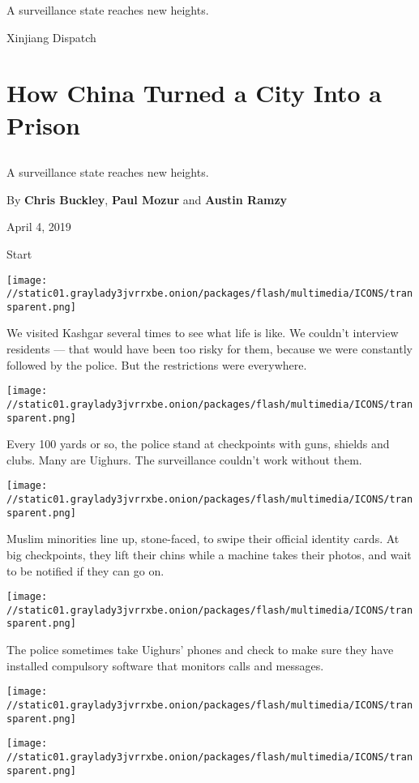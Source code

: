 A surveillance state reaches new heights.

Xinjiang Dispatch

\hypertarget{how-china-turned-a-city-into-a-prison-1}{%
\section{How China Turned a City Into a
Prison}\label{how-china-turned-a-city-into-a-prison-1}}

\subsection{}

A surveillance state reaches new heights.

By \textbf{Chris Buckley}, \textbf{Paul Mozur} and \textbf{Austin Ramzy}

April 4, 2019

Start

\texttt{[image: //static01.graylady3jvrrxbe.onion/packages/flash/multimedia/ICONS/transparent.png]}

We visited Kashgar several times to see what life is like. We couldn't
interview residents --- that would have been too risky for them, because
we were constantly followed by the police. But the restrictions were
everywhere.

\texttt{[image: //static01.graylady3jvrrxbe.onion/packages/flash/multimedia/ICONS/transparent.png]}

Every 100 yards or so, the police stand at checkpoints with guns,
shields and clubs. Many are Uighurs. The surveillance couldn't work
without them.

\texttt{[image: //static01.graylady3jvrrxbe.onion/packages/flash/multimedia/ICONS/transparent.png]}

Muslim minorities line up, stone-faced, to swipe their official identity
cards. At big checkpoints, they lift their chins while a machine takes
their photos, and wait to be notified if they can go on.

\texttt{[image: //static01.graylady3jvrrxbe.onion/packages/flash/multimedia/ICONS/transparent.png]}

The police sometimes take Uighurs' phones and check to make sure they
have installed compulsory software that monitors calls and messages.

\texttt{[image: //static01.graylady3jvrrxbe.onion/packages/flash/multimedia/ICONS/transparent.png]}

\texttt{[image: //static01.graylady3jvrrxbe.onion/packages/flash/multimedia/ICONS/transparent.png]}

